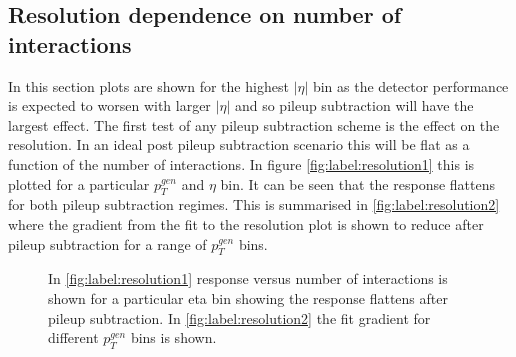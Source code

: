 \subsection{Resolution dependence on number of interactions}
In this section plots are shown for the highest $|\eta|$ bin as the detector performance is expected to worsen with larger $|\eta|$ and so pileup subtraction will have the largest effect. The first test of any pileup subtraction scheme is the effect on the resolution. In an ideal post pileup subtraction scenario this will be flat as a function of the number of interactions. In figure \ref{fig:label:resolution1} this is plotted for a particular $p^{gen}_T$ and $\eta$ bin. It can be seen that the response flattens for both pileup subtraction regimes. This is summarised in \ref{fig:label:resolution2} where the gradient from the fit to the resolution plot is shown to reduce after pileup subtraction for a range of $p^{gen}_T$ bins.  
\begin{figure}
\hfill
{}
\hfill
{}
\caption{In \ref{fig:label:resolution1} response versus number of interactions is shown for a particular eta bin showing the response flattens after pileup subtraction. In \ref{fig:label:resolution2} the fit gradient for different $p^{gen}_{T}$ bins is shown.}
\label{fig:label:resolution}
\end{figure}
